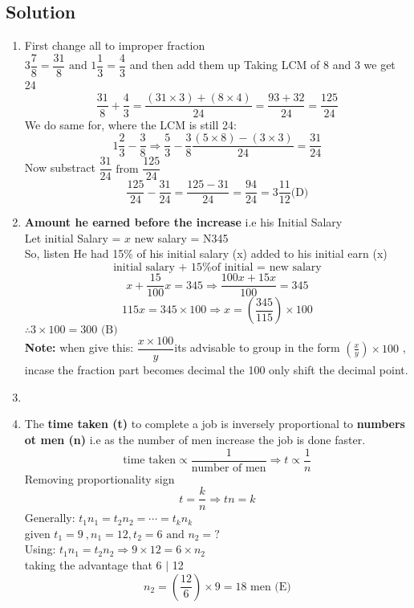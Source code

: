 \subsection{Solution}
\begin{multicols}{2}
\begin{enumerate}[label={\arabic*.}]
    \item First change all to improper fraction \\
    \(3\dfrac{7}{8} = \dfrac{31}{8} \text { and } 1\dfrac{1}{3} = \dfrac{4}{3}\) and then add them up 
    Taking LCM of 8 and 3 we get 24
    \[\frac{31}{8} + \frac{4}{3} = \frac{(31 \times 3) + (8 \times 4) }{24} = \frac{93 + 32}{24} = \dfrac{125}{24} \]
    We do same for, where the LCM is still 24: 
    \[1\frac{2}{3} - \frac{3}{8} \Rightarrow \frac{5}{3} - \frac{3}{8}  \frac{(5 \times 8) - (3 \times 3)}{24} = \frac{31}{24}\]
    Now substract \(\dfrac{31}{24} \text { from } \dfrac{125}{24}\)
    \[\frac{125}{24} - \frac{31}{24} = \frac{125 - 31}{24} = \frac{94}{24} = 3\frac{11}{12} \text{(D)} \]
    \item \textbf{Amount he earned before the increase} i.e his Initial Salary \\
    Let initial Salary = \(x\) \hspace {10px}  new salary = N345\\
    So, listen He had 15\% of his initial salary (x) added to his initial earn (x)
    \[\text{initial salary + 15\% of initial = new salary}\]
    \[x + \dfrac{15}{100}x = 345 \Rightarrow \dfrac{100x + 15x}{100} = 345\]
    \[115x = 345 \times 100 \Rightarrow x = \left(\frac{345}{115}\right) \times 100\]
    \(\therefore 3 \times 100 = 300 \text{ (B)}\)\\
    \textbf{Note:} when give this: \( \dfrac{x \times 100}{y}\)its advisable to group in the form
    \(\left(\frac{x}{y}\right) \times 100\) , incase the fraction part becomes decimal the 100 only shift the
    decimal point. 

    \item
    \item The \textbf{time taken (t)} to complete a job is inversely proportional to \textbf{numbers ot men (n)} 
    i.e as the number of men increase the job is done faster. 
    \begin{equation}
        \text{time taken} \propto \dfrac{1}{\text{number of men}} \Rightarrow t \propto \dfrac{1}{n}
    \end {equation}
    Removing proportionality sign
    \[t = \dfrac{k}{n} \Rightarrow tn = k\]
    Generally: \(t_{1}n_{1} = t_{2}n_2 = \cdots = t_{k}n_{k}\)\\
    given \(t_{1} = 9\ , n_{1} = 12 , t_{2} = 6 \text{ and } n_{2} = ?\) \\
    Using: \(t_{1}n_{1} = t_{2}n_{2} \Rightarrow 9 \times 12 = 6 \times n_{2}\) \\
    taking the advantage that 6 $\mid$ 12 
    \[n_{2} = \left(\frac{12}{6}\right) \times 9 = 18 \text { men (E)}\]


\end{enumerate}
\end{multicols}
